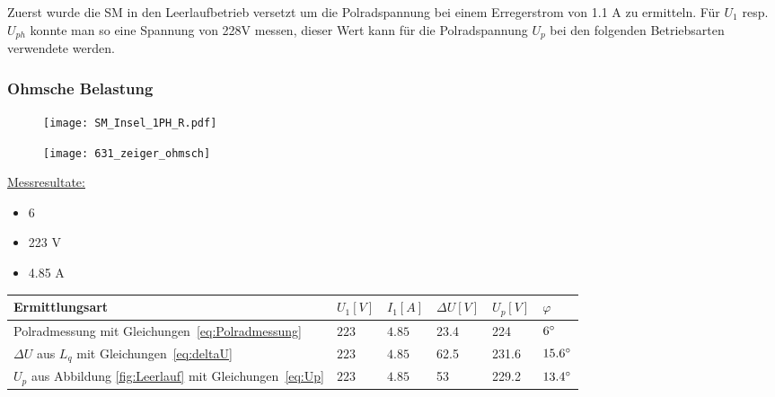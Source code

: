 \begin{flushleft}
Zuerst wurde die SM in den Leerlaufbetrieb versetzt um die Polradspannung bei einem Erregerstrom von 1.1 A zu ermitteln. Für $U_1$ resp. $U_{ph}$ konnte man so eine Spannung von 228V messen, dieser Wert kann für die Polradspannung $U_p$ bei den folgenden Betriebsarten verwendete werden. 

\subsubsection{Ohmsche Belastung}

\begin{figure}[H]
\begin{minipage}[t]{0.45\textwidth}
\centering
\texttt{[image: SM\_Insel\_1PH\_R.pdf]}
\label{fig:abb1}
\end{minipage}
\begin{minipage}[t]{0.4\textwidth}
\centering
\texttt{[image: 631\_zeiger\_ohmsch]}
    \label{fig:abb1}
\end{minipage}
\end{figure}


\underline{Messresultate:}\\
\vspace{0.3cm}


\begin{itemize}
\item {}            6\degree
\item {}            223 V
\item {}            4.85 A
\end{itemize}

\vspace{0.5cm}

\begin{tabular}{|l|l|l|l|l|l|}
 \hline
 \rowcolor[gray]{.8} \textbf{Ermittlungsart} & \textbf{$U_1 [V]$}&   \textbf{$I_1 [A]$} &\textbf{$\Delta U [V]$} & \textbf{$U_p [V]$} & \textbf{$\varphi$}\\
 \hline
 Polradmessung mit Gleichungen~\ref{eq:Polradmessung}& $223$ & $4.85$ & 23.4& 224& $6\degree$ \\
\hline
 $\Delta U$ aus $L_q$ mit Gleichungen~\ref{eq:deltaU} & $223$ & $4.85$ & 62.5& 231.6& $15.6\degree$ \\
\hline
 $U_p$ aus Abbildung \ref{fig:Leerlauf} mit Gleichungen~\ref{eq:Up} & $223$ & $4.85$ & 53& 229.2&  $13.4\degree$\\
\hline
\end{tabular}


\end{flushleft}
